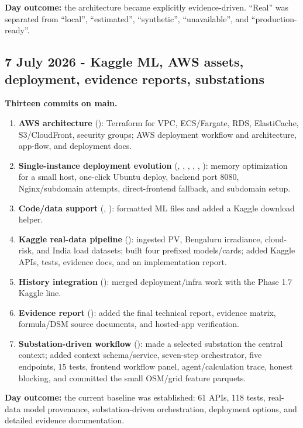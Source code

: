 \documentclass[10pt,a4paper]{article}
\begin{document}
\textbf{Day outcome:} the architecture became explicitly evidence-driven. ``Real'' was separated
from ``local'', ``estimated'', ``synthetic'', ``unavailable'', and ``production-ready''.

\subsection{7 July 2026 - Kaggle ML, AWS assets, deployment, evidence reports, substations}

\textbf{Thirteen commits on main.}

\begin{enumerate}
  \item \textbf{AWS architecture} (): Terraform for VPC, ECS/Fargate, RDS,
        ElastiCache, S3/CloudFront, security groups; AWS deployment workflow and architecture,
        app-flow, and deployment docs.
  \item \textbf{Single-instance deployment evolution} (, ,
        , , , ): memory optimization for
        a small host, one-click Ubuntu deploy, backend port 8080, Nginx/subdomain attempts,
        direct-frontend fallback, and subdomain setup.
  \item \textbf{Code/data support} (, ): formatted ML files and added
        a Kaggle download helper.
  \item \textbf{Kaggle real-data pipeline} (): ingested PV, Bengaluru irradiance,
        cloud-risk, and India load datasets; built four prefixed models/cards; added Kaggle APIs,
        tests, evidence docs, and an implementation report.
  \item \textbf{History integration} (): merged deployment/infra work with the
        Phase 1.7 Kaggle line.
  \item \textbf{Evidence report} (): added the final technical report, evidence
        matrix, formula/DSM source documents, and hosted-app verification.
  \item \textbf{Substation-driven workflow} (): made a selected substation the
        central context; added context schema/service, seven-step orchestrator, five endpoints,
        15 tests, frontend workflow panel, agent/calculation trace, honest blocking, and committed
        the small OSM/grid feature parquets.
\end{enumerate}

\textbf{Day outcome:} the current  baseline was established: 61 APIs, 118 tests,
real-data model provenance, substation-driven orchestration, deployment options, and detailed
evidence documentation.
\end{document}
